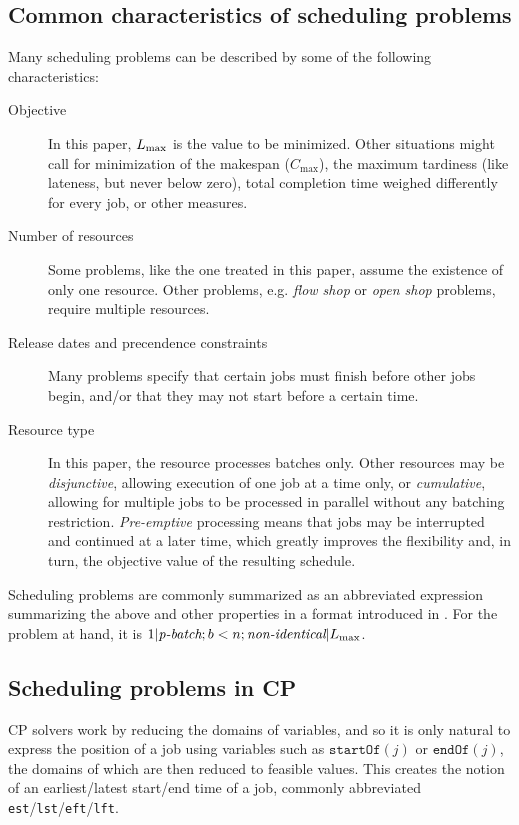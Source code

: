\documentclass[13pt, letterpaper, oneside]{book}
\begin{document}
\subsection{Common characteristics of scheduling problems}
Many scheduling problems can be described by some of the following
characteristics:
\begin{description}
\item[Objective]{In this paper, $L_{\text{max}}$ is the value to be minimized. Other
situations might call for minimization of the makespan ($C_\text{max}$), the
maximum tardiness (like lateness, but never below zero), total completion time
weighed differently for every job, or other measures.}
\item[Number of resources]{Some problems, like the one treated in this paper,
assume the existence of only one resource. Other problems, e.g. \textit{flow
shop} or \textit{open shop} problems, require multiple resources.}
\item[Release dates and precendence constraints]{Many problems specify that
certain jobs must finish before other jobs begin, and/or that they may not start
before a certain time.}
\item[Resource type]{In this paper, the resource processes batches only. Other
resources may be \textit{disjunctive}, allowing execution of one job at a time
only, or \textit{cumulative}, allowing for multiple jobs to be processed in
parallel without any batching restriction. \textit{Pre-emptive} processing means
that jobs may be interrupted and continued at a later time, which greatly
improves the flexibility and, in turn, the objective value of the resulting
schedule.}
\end{description}

Scheduling problems are commonly summarized as an abbreviated expression
summarizing the above and other properties in a format introduced in
\citet{graham}. For the problem at hand, it is $1|\textit{p-batch}; b < n;
\textit{non-identical}|L_{\text{max}}$.

\subsection{Scheduling problems in CP}
\label{sec:schedulingcp}
CP solvers work by reducing the domains of variables, and so it is only natural
to express the position of a job using variables such as $\mathtt{startOf}(j)$
or $\mathtt{endOf}(j)$, the domains of which are then reduced to feasible
values. This creates the notion of an earliest/latest start/end time of a job,
commonly abbreviated \texttt{est}/\texttt{lst}/\texttt{eft}/\texttt{lft}.
\end{document}
